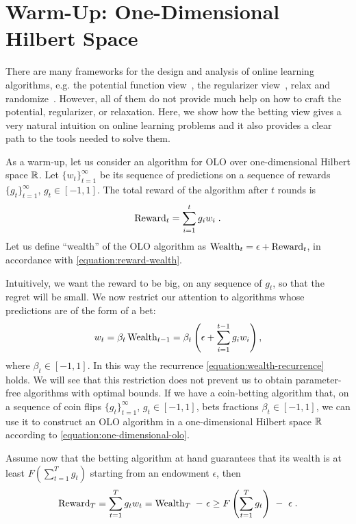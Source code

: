 \section{Warm-Up: One-Dimensional Hilbert Space}
\label{section:one-dimensional-hilbert-space-olo}

There are many frameworks for the design and analysis of online learning
algorithms, e.g. the potential function view~\cite{Cesa-Bianchi-Lugosi-2006},
the regularizer view~\cite{Shalev-Shwartz-2011}, relax and
randomize~\cite{Rakhlin-Shamir-Sridharan-2012}. However, all of them do not
provide much help on how to craft the potential, regularizer, or relaxation.
Here, we show how the betting view gives a very natural intuition on online
learning problems and it also provides a clear path to the tools needed to
solve them.

As a warm-up, let us consider an algorithm for OLO over one-dimensional Hilbert
space $\mathbb{R}$.  Let $\{w_t\}_{t=1}^\infty$ be its sequence of predictions on a
sequence of rewards $\{g_t\}_{t=1}^\infty$, $g_t \in [-1,1]$. The total reward
of the algorithm after $t$ rounds is
\vspace{-.1cm}
\[
\operatorname{Reward}_t = \sum_{i=1}^t g_i w_i \; .
\]
Let us define ``wealth'' of the OLO algorithm as $\operatorname{Wealth}_t = \epsilon +
\operatorname{Reward}_t$, in accordance with \eqref{equation:reward-wealth}.

Intuitively, we want the reward to be big, on any sequence of $g_t$, so that
the regret will be small. We now restrict our attention to algorithms whose
predictions are of the form of a bet:
\vspace{-.1cm}
\begin{equation}
\label{equation:one-dimensional-olo}
w_t = \beta_t \operatorname{Wealth}_{t-1}
= \beta_t \left(\epsilon+ \sum_{i=1}^{t-1} g_i w_i \right),
\end{equation}
where $\beta_t \in [-1,1]$. In this way the recurrence
\eqref{equation:wealth-recurrence} holds. We will see that this restriction
does not prevent us to obtain parameter-free algorithms with optimal bounds.
If we have a coin-betting algorithm that, on a sequence of coin flips
$\{g_t\}_{t=1}^\infty$, $g_t \in [-1,1]$, bets fractions $\beta_t \in [-1,1]$,
we can use it to construct an OLO algorithm in a one-dimensional Hilbert space
$\mathbb{R}$ according to \eqref{equation:one-dimensional-olo}.

Assume now that the betting algorithm at hand guarantees that its wealth is at
least $F(\sum_{t=1}^T g_t)$ starting from an endowment $\epsilon$, then
\vspace{-.1cm}
\begin{equation}
\label{equation:one-dimensional-olo-reward-lower-bound}
\Reward_T
= \sum_{t=1}^T g_t w_t
= \Wealth_T \ - \ \epsilon \ge F\left(\sum_{t=1}^T g_t \right) \ - \ \epsilon \; .
\end{equation}

